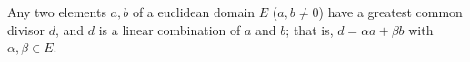 Any two elements $a, b$ of a euclidean domain $E$ ($a, b \neq 0$) have a greatest common divisor $d$, and $d$ is a linear combination of $a$ and $b$; that is, $d = \alpha a + \beta b$ with $\alpha, \beta \in E$.
